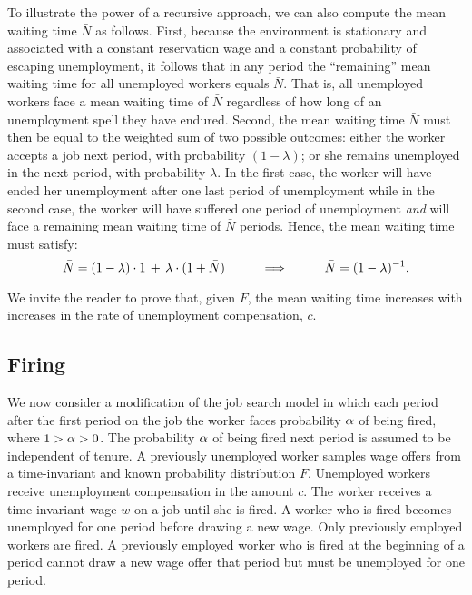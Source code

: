 To illustrate the power of  a recursive approach, we can also
compute the mean waiting time $\bar N$ as follows. First, because the  environment is stationary
and associated with a constant
reservation wage and a constant probability of escaping unemployment, it
follows that  in any  period the ``remaining'' mean waiting time for all unemployed workers
equals $\bar N$. That is, all unemployed workers face
a mean waiting time of $\bar N$ regardless of
how long of an unemployment spell they have endured.
Second, the mean waiting time $\bar N$ must then be equal to the weighted
sum of two possible outcomes: either the worker accepts a job next period,
with probability $(1-\lambda)$; or she remains unemployed in the next
period, with probability $\lambda$. In the first case, the worker will have
ended her unemployment after one last period of unemployment while in the
second case, the worker will have suffered one period of unemployment {\it and}
will face a remaining mean waiting time of $\bar N$ periods. Hence, the
mean waiting time must satisfy:
$$
\bar N = (1-\lambda)\cdot 1 \,+\, \lambda \cdot (1 + \bar N)
\hskip1cm \Longrightarrow \hskip1cm  \bar N = (1-\lambda)^{-1}.
$$

We invite the reader to prove that, given $F$, the mean waiting time
increases with increases in the rate of unemployment compensation, $c$.

\subsection{Firing}\label{firing}%
We now consider a modification of the job search model in which each
period after the first period on the job the worker faces probability
$\alpha$
of being fired, where
$1>\alpha>0$.  The probability $\alpha$ of being fired next period is assumed to
be independent of tenure.  A previously unemployed worker samples wage offers from a
time-invariant and known probability distribution $F$. Unemployed workers receive
unemployment compensation in the amount $c$. The  worker receives a
time-invariant wage $w$ on a job until she is fired. A worker who is fired
becomes unemployed for one period before drawing a new wage. Only previously employed workers are fired.
A previously employed worker who is fired at the beginning of a period cannot draw a new wage offer that period but must
be unemployed for one period.

